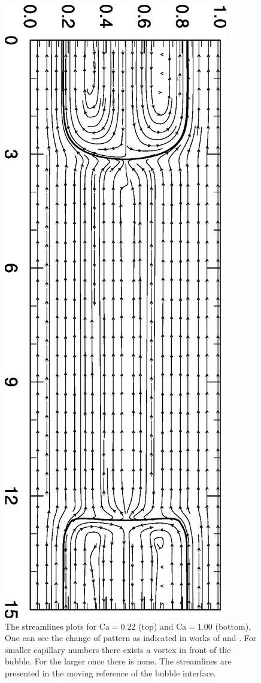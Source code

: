 \documentclass[preprint,12pt]{elsarticle}
\newcommand{\Ca}{\mathrm{Ca}}
\begin{document}
\begin{figure}
\includegraphics[angle=90,width=\textwidth]{Figures/Capillary/ca100_velocity_new.eps}
\caption{The streamlines plots for $\Ca=0.22$ (top) and $\Ca=1.00$ (bottom). One can see the change
of pattern as indicated in works of \citet{heil-bretherton} and \citet{giavedoni-numerical}. For
smaller capillary numbers there exists a vortex in front of the bubble. For the larger once there
is none. The streamlines are presented in the moving reference of the bubble
interface.\label{fig:streamlines:pattern}}
\end{figure}
\end{document}
